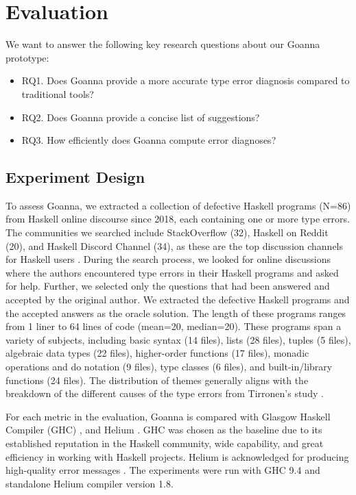     \section{Evaluation} \label{sec:evaluation}

     We want to answer the following key research questions about our Goanna prototype:

    \begin{itemize}
        \item RQ1. Does Goanna provide a more accurate type error diagnosis compared to traditional tools?
        \item RQ2. Does Goanna provide a concise list of suggestions?
        \item RQ3. How efficiently does Goanna compute error diagnoses?
    \end{itemize}

    \subsection{Experiment Design} \label{sub:dataset}

    To assess Goanna, we extracted a collection of defective Haskell programs (N=86) from Haskell online discourse since 2018, each containing one or more type errors. The communities we searched include StackOverflow (32), Haskell on Reddit (20), and Haskell Discord Channel (34), as these are the top discussion channels for Haskell users \cite{Fausak2022-zf}. During the search process, we looked for online discussions where the authors encountered type errors in their Haskell programs and asked for help. Further, we selected only the questions that had been answered and accepted by the original author. We extracted the defective Haskell programs and the accepted answers as the oracle solution. The length of these programs ranges from 1 liner to 64 lines of code (mean=20, median=20). These programs span a variety of subjects, including basic syntax (14 files), lists (28 files), tuples (5 files), algebraic data types (22 files), higher-order functions (17 files), monadic operations and do notation (9 files), type classes (6 files), and built-in/library functions (24 files). The distribution of themes generally aligns with the breakdown of the different causes of the type errors from Tirronen's study \cite{Tirronen2015-nr}.
    
    	For each metric in the evaluation, Goanna is compared with Glasgow Haskell Compiler (GHC) \cite{Gamari_undated-zu}, and Helium \cite{Helium4Haskell2023-kk}. GHC was chosen as the baseline due to its established reputation in the Haskell community, wide capability, and great efficiency in working with Haskell projects. Helium is acknowledged for producing high-quality error messages \cite{Heeren2003-kd}. The experiments were run with GHC 9.4 and standalone Helium compiler version 1.8.
    
